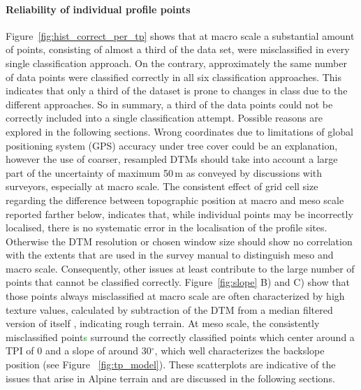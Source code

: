 \documentclass[preprint,12pt,authoryear]{elsarticle}
\begin{document}
\paragraph{Reliability of individual profile points} 
Figure~\ref{fig:hist_correct_per_tp} shows that at macro scale a substantial amount of points, consisting of almost a third of the data set, were misclassified in every single classification approach. On the contrary, approximately the same number of data points were classified correctly in all six classification approaches. This indicates that only a third of the dataset is prone to changes in class due to the different approaches. So in summary, a third of the data points could not be correctly included into a single classification attempt. Possible reasons are explored in the following sections. Wrong coordinates due to limitations of global positioning system (GPS) accuracy under tree cover could be an explanation, however the use of coarser, resampled DTMs should take into account a large part of the uncertainty of maximum 50\,m as conveyed by discussions with surveyors, especially at macro scale. The consistent effect of grid cell size regarding the difference between topographic position at macro and meso scale reported farther below, indicates that, while individual points may be incorrectly localised, there is no systematic error in the localisation of the profile sites. Otherwise the DTM resolution or chosen window size should show no correlation with the extents that are used in the survey manual to distinguish meso and macro scale. Consequently, other issues at least contribute to the large number of points that cannot be classified correctly. Figure~\ref{fig:slope} B) and C) show that those points always misclassified at macro scale are often characterized by high texture values, calculated by subtraction of the DTM from a median filtered version of itself \citep{Iwahashi2007}, indicating rough terrain. At meso scale, the consistently misclassified point\textcolor{green}{s} surround the correctly classified points which center around a TPI of 0 and a slope of around 30$^{\circ}$, which well characterizes the backslope position (see Figure~ \ref{fig:tp_model}). These scatterplots are indicative of the issues that arise in Alpine terrain and are discussed in the following sections.
\end{document}
